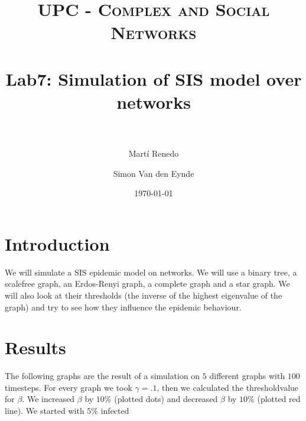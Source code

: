 \documentclass[paper=a4, fontsize=11pt]{scrartcl} %
\title{
\normalfont \normalsize
\textsc{UPC - Complex and Social Networks} \\ [25pt] %
\horrule{0.5pt} \\[0.4cm] %
\huge Lab7: Simulation of SIS model over networks \\ %
\horrule{2pt} \\[0.5cm] %
}
\author{Mart\'{i} Renedo\and Simon Van den Eynde} %
\date{\normalsize\today} %
\begin{document}
\maketitle %



\section{Introduction}

We will simulate a SIS epidemic model on networks. We will use a binary tree, a scalefree graph, an Erdos-Renyi graph, a complete graph and a star graph. We will also look at their thresholds (the inverse of the highest eigenvalue of the graph) and try to see how they influence the epidemic behaviour.


\section{Results}

The following graphs are the result of a simulation on $5$ different graphs with $100$ timesteps. For every graph we took $\gamma=.1$, then we calculated the thresholdvalue for $\beta$. We increased $\beta$ by $10\%$ (plotted dots) and decreased $\beta$ by $10\%$ (plotted red line). We started with $5\%$ infected
\end{document}

